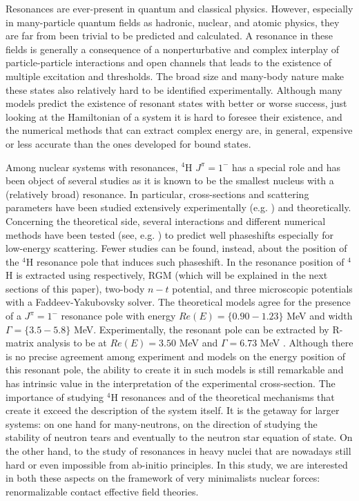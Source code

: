 \documentclass[aps,onecolumn,preprintnumbers,amsmath,amssymb,nofootinbib,superscriptaddress,notitlepage]{revtex4-1}
\begin{document}
Resonances are ever-present in quantum and classical physics.
However, especially in many-particle quantum fields as hadronic, nuclear, and atomic physics, they are far from been trivial to be predicted and calculated. 
A resonance in these fields is generally a consequence of a nonperturbative and complex interplay of particle-particle interactions and open channels that leads to the existence of multiple excitation and thresholds. 
The broad size and many-body nature make these states also relatively hard to be identified experimentally. 
Although many models predict the existence of resonant states with better or worse success, just looking at the Hamiltonian of a system it is hard to foresee their existence, and the numerical methods that can extract complex energy are, in general, expensive or less accurate than the ones developed for bound states.
%

%
Among nuclear systems with resonances, $^4$H $J^\pi=1^-$ has a special role and has been object of several studies as it is known to be the smallest nucleus with a (relatively broad) resonance.
%
In particular, cross-sections and scattering parameters have been studied extensively experimentally (e.g. \cite{osti_4230875, Phillips:1980zz, Tilley:1992zz}) and theoretically.
Concerning the theoretical side, several interactions and different numerical methods have been tested
(see, e.g. \cite{Ciesielski:1997vy,Ciesielski:1998sy,Ciesielski:1999pp,Viviani:1998gr,Fonseca:1999zz,Lazauskas:2004uq}) to predict well phaseshifts especially for low-energy scattering.
%
Fewer studies can be found, instead, about the position of the $^4$H resonance pole that induces such phaseshift. 
In \cite{Arai:2003ek,deDiego:2007rd,Lazauskas:2019cxj} the resonance position of $^4$H is extracted using respectively, RGM (which will be explained in the next sections of this paper), two-body $n-t$ potential, and three microscopic potentials with a Faddeev-Yakubovsky solver. 
The theoretical models agree for the presence of a $J^\pi=1^-$ resonance pole with energy $Re(E)=\{0.90 - 1.23\}$ MeV and width $\Gamma=\{3.5 - 5.8\}$ MeV.
Experimentally, the resonant pole can be extracted by R-matrix analysis to be at $Re(E)=3.50$ MeV and  $\Gamma=6.73$ MeV \cite{Tilley:1992zz}.
Although there is no precise agreement among experiment and models on the energy position of this resonant pole, the ability to create it in such models is still remarkable and has intrinsic value in the interpretation of the experimental cross-section.
%
The importance of studying $^4$H resonances and of the theoretical mechanisms that create it exceed the description of the system itself. 
It is the getaway for larger systems: on one hand for many-neutrons, on the direction of studying the stability of neutron tears and eventually to the neutron star equation of state.
On the other hand, to the study of resonances in heavy nuclei that are nowadays still hard or even impossible from ab-initio principles. 
%
In this study, we are interested in both these aspects on the framework of very minimalists nuclear forces: renormalizable contact effective field theories. 
%
\end{document}
